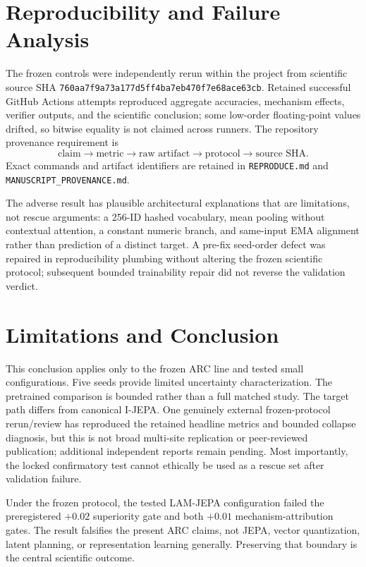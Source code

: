 \documentclass[10pt,conference]{IEEEtran}
\begin{document}
\section{Reproducibility and Failure Analysis}
The frozen controls were independently rerun within the project from scientific source SHA \texttt{760aa7f9a73a177d5ff4ba7eb470f7e68ace63cb}. Retained successful GitHub Actions attempts reproduced aggregate accuracies, mechanism effects, verifier outputs, and the scientific conclusion; some low-order floating-point values drifted, so bitwise equality is not claimed across runners. The repository provenance requirement is
\begin{equation}
\text{claim}\rightarrow\text{metric}\rightarrow\text{raw artifact}\rightarrow\text{protocol}\rightarrow\text{source SHA}.
\end{equation}
Exact commands and artifact identifiers are retained in \texttt{REPRODUCE.md} and \texttt{MANUSCRIPT\_PROVENANCE.md}.

The adverse result has plausible architectural explanations that are limitations, not rescue arguments: a 256-ID hashed vocabulary, mean pooling without contextual attention, a constant numeric branch, and same-input EMA alignment rather than prediction of a distinct target. A pre-fix seed-order defect was repaired in reproducibility plumbing without altering the frozen scientific protocol; subsequent bounded trainability repair did not reverse the validation verdict.

\section{Limitations and Conclusion}
This conclusion applies only to the frozen ARC line and tested small configurations. Five seeds provide limited uncertainty characterization. The pretrained comparison is bounded rather than a full matched study. The target path differs from canonical I-JEPA. One genuinely external frozen-protocol rerun/review has reproduced the retained headline metrics and bounded collapse diagnosis, but this is not broad multi-site replication or peer-reviewed publication; additional independent reports remain pending. Most importantly, the locked confirmatory test cannot ethically be used as a rescue set after validation failure.

Under the frozen protocol, the tested LAM-JEPA configuration failed the preregistered $+0.02$ superiority gate and both $+0.01$ mechanism-attribution gates. The result falsifies the present ARC claims, not JEPA, vector quantization, latent planning, or representation learning generally. Preserving that boundary is the central scientific outcome.



\end{document}
